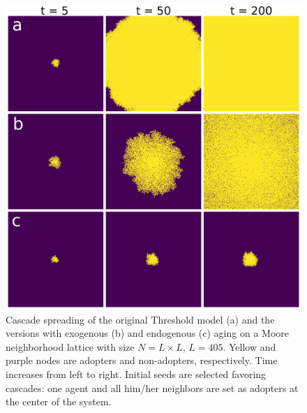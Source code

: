 \begin{figure}
\includegraphics[width=\columnwidth]{Figs/Aging_Threshold/LATT_PLOT.png}
\caption[Cascade spreading of the Threshold model in a lattice]{\label{fig:evo_lat} Cascade spreading of the original Threshold model (a) and the versions with exogenous (b) and endogenous (c) aging on a Moore neighborhood lattice with size $N = L \times L$, $L = 405$. Yellow and purple nodes are adopters and non-adopters, respectively. Time increases from left to right. Initial seeds are selected favoring cascades: one agent and all him/her neighbors are set as adopters at the center of the system.}
\end{figure}


